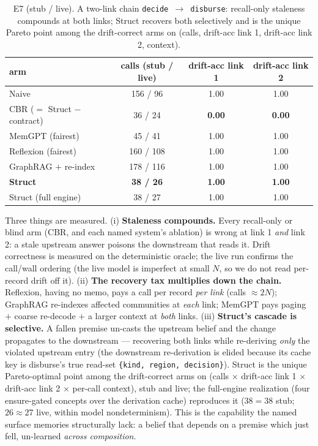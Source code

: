 \documentclass[11pt]{article}
\begin{document}
\begin{table}[h]\centering
\begin{tabular}{lccc}
\toprule
arm & calls (stub / live) & drift-acc link 1 & drift-acc link 2 \\
\midrule
Naive & 156 / 96 & 1.00 & 1.00 \\
CBR ($=$ Struct $-$ contract) & 36 / 24 & \textbf{0.00} & \textbf{0.00} \\
MemGPT (fairest) & 45 / 41 & 1.00 & 1.00 \\
Reflexion (fairest) & 160 / 108 & 1.00 & 1.00 \\
GraphRAG $+$ re-index & 178 / 116 & 1.00 & 1.00 \\
\textbf{Struct} & \textbf{38 / 26} & \textbf{1.00} & \textbf{1.00} \\
Struct (full engine) & 38 / 27 & 1.00 & 1.00 \\
\bottomrule
\end{tabular}
\caption{E7 (stub / live). A two-link chain \texttt{decide $\to$ disburse}: recall-only staleness compounds at both links; Struct recovers both selectively and is the unique Pareto point among the drift-correct arms on (calls, drift-acc link 1, drift-acc link 2, context).}
\label{tab:e7}
\end{table}

Three things are measured. (i) \textbf{Staleness compounds.} Every recall-only or blind arm (CBR, and each named
system's ablation) is wrong at link 1 \emph{and} link 2: a stale upstream answer poisons the downstream that reads
it. Drift correctness is measured on the deterministic oracle; the live run confirms the call/wall ordering (the
live model is imperfect at small $N$, so we do not read per-record drift off it). (ii) \textbf{The recovery tax multiplies down the chain.} Reflexion, having no
memo, pays a call per record \emph{per link} (calls $\approx 2N$); GraphRAG re-indexes affected communities at
\emph{each} link; MemGPT pays paging $+$ coarse re-decode $+$ a larger context at \emph{both} links. (iii)
\textbf{Struct's cascade is selective.} A fallen premise un-casts the upstream belief and the change propagates to
the downstream --- recovering both links while re-deriving \emph{only} the violated upstream entry (the downstream
re-derivation is elided because its cache key is disburse's true read-set \texttt{\{kind, region, decision\}}).
Struct is the unique Pareto-optimal point among the drift-correct arms on (calls $\times$ drift-acc link 1 $\times$ drift-acc link 2 $\times$
per-call context), stub and live; the full-engine realization (four ensure-gated concepts over the derivation
cache) reproduces it ($38{=}38$ stub; $26\approx27$ live, within model nondeterminism). This is the capability the
named surface memories structurally lack: a belief that depends on a premise which just fell, un-learned
\emph{across composition}.
\end{document}
